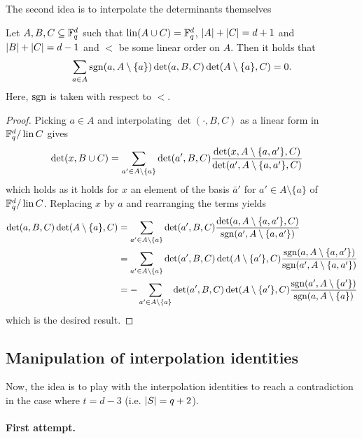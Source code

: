 \documentclass[a4paper]{article}
\begin{document}
The second idea is to interpolate the determinants themselves

\begin{lemma}
  Let $A,B,C\subseteq \mathbb{F}_{q}^d$ such that $\mathop\mathrm{lin}(A\cup
  C)=\mathbb{F}_{q}^d$, $\left|A\right|+\left|C\right|=d+1$ and $\left|B\right|+\left|C\right|=d-1$ and $<$
  be some linear order on $A$. Then it holds that
  \begin{align}
    \sum_{a\in A}{\mathop\mathrm{sgn}(a,A\setminus\{a\})\det(a,B,C)\det(A\setminus\{a\},C)}=0\text{.}
  \end{align}
  Here, $\mathop\mathrm{sgn}$ is taken with respect to $<$.
\end{lemma}

\begin{proof}
  Picking $a\in A$ and interpolating $\det(\cdot,B,C)$ as a linear form in
  $\mathbb{F}_{q}^d/\mathop\mathrm{lin}{C}$ gives
  \begin{align*}
    \det(x,B\cup C) 
    &= \sum_{a'\in A\setminus\{a\}}{\det(a',B,C)\frac{\det(x,A\setminus\{a,a'\},C)}{\det(a',A\setminus\{a,a'\},C)}}
  \end{align*}
  which holds as it holds for $x$ an element of the basis $\bar{a}'$ for $a'\in
  A\setminus\{a\}$ of $\mathbb{F}_{q}^d/\mathop\mathrm{lin}{C}$. Replacing $x$ by $a$ and
  rearranging the terms yields
  \begin{align*}
    \det(a,B,C)\det(A\setminus\{a\},C)
    &= 
    \sum_{a'\in A\setminus\{a\}}{\det(a',B,C)\frac{\det(a,A\setminus\{a,a'\},C)}{\mathop\mathrm{sgn}(a',A\setminus\{a,a'\})}}\\
    &= 
    \sum_{a'\in A\setminus\{a\}}{\det(a',B,C)\det(A\setminus\{a'\},C)\frac{\mathop\mathrm{sgn}(a,A\setminus\{a,a'\})}{\mathop\mathrm{sgn}(a',A\setminus\{a,a'\})}}\\
    &= 
    -\sum_{a'\in A\setminus\{a\}}{\det(a',B,C)\det(A\setminus\{a'\},C)\frac{\mathop\mathrm{sgn}(a',A\setminus\{a'\})}{\mathop\mathrm{sgn}(a,A\setminus\{a\})}}
  \end{align*}
  which is the desired result.
\end{proof}

\subsection{Manipulation of interpolation identities}

Now, the idea is to play with the interpolation identities to reach a
contradiction in the case where $t= d-3$ (i.e. $\left|S\right|=q+2$).

\paragraph{First attempt.}
\end{document}
